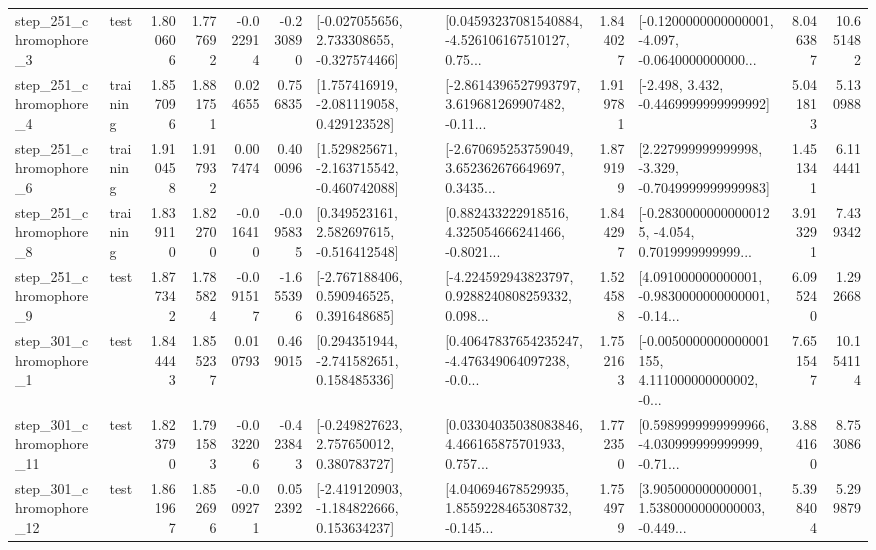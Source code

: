 \begin{tabular}{llrrrrllrlrr}
   step\_251\_chromophore\_3 &      test &      1.800606 &    1.777692 &     -0.022914 & -0.230890 &   [-0.027055656, 2.733308655, -0.327574466] &  [0.04593237081540884, -4.526106167510127, 0.75... &       1.844027 &  [-0.1200000000000001, -4.097, -0.0640000000000... &            8.046387 &         10.651482 \\
   step\_251\_chromophore\_4 &  training &      1.857096 &    1.881751 &      0.024655 &  0.756835 &    [1.757416919, -2.081119058, 0.429123528] &  [-2.8614396527993797, 3.619681269907482, -0.11... &       1.919781 &               [-2.498, 3.432, -0.4469999999999992] &            5.041813 &          5.130988 \\
   step\_251\_chromophore\_6 &  training &      1.910458 &    1.917932 &      0.007474 &  0.400096 &   [1.529825671, -2.163715542, -0.460742088] &  [-2.670695253759049, 3.652362676649697, 0.3435... &       1.879199 &   [2.227999999999998, -3.329, -0.7049999999999983] &            1.451341 &          6.114441 \\
   step\_251\_chromophore\_8 &  training &      1.839110 &    1.822700 &     -0.016410 & -0.095835 &    [0.349523161, 2.582697615, -0.516412548] &  [0.882433222918516, 4.325054666241466, -0.8021... &       1.844297 &  [-0.28300000000000125, -4.054, 0.7019999999999... &            3.913291 &          7.439342 \\
   step\_251\_chromophore\_9 &      test &      1.877342 &    1.785824 &     -0.091517 & -1.655396 &    [-2.767188406, 0.590946525, 0.391648685] &  [-4.224592943823797, 0.9288240808259332, 0.098... &       1.524588 &  [4.091000000000001, -0.9830000000000001, -0.14... &            6.095240 &          1.292668 \\
   step\_301\_chromophore\_1 &      test &      1.844443 &    1.855237 &      0.010793 &  0.469015 &    [0.294351944, -2.741582651, 0.158485336] &  [0.40647837654235247, -4.476349064097238, -0.0... &       1.752163 &  [-0.0050000000000001155, 4.111000000000002, -0... &            7.651547 &         10.154114 \\
  step\_301\_chromophore\_11 &      test &      1.823790 &    1.791583 &     -0.032206 & -0.423843 &    [-0.249827623, 2.757650012, 0.380783727] &  [0.03304035038083846, 4.466165875701933, 0.757... &       1.772350 &  [0.5989999999999966, -4.030999999999999, -0.71... &            3.884160 &          8.753086 \\
  step\_301\_chromophore\_12 &      test &      1.861967 &    1.852696 &     -0.009271 &  0.052392 &   [-2.419120903, -1.184822666, 0.153634237] &  [4.040694678529935, 1.8559228465308732, -0.145... &       1.754979 &  [3.905000000000001, 1.5380000000000003, -0.449... &            5.398404 &          5.299879 \\

\end{tabular}
